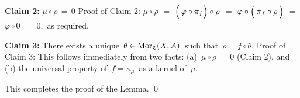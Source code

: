 \vskip 0.3cm
\noindent
\textbf{Claim 2:}\;\; $\mu \circ \rho \,=\, 0$
\vskip 0.1cm
\noindent
Proof of Claim 2:\;
$\mu \circ \rho$
\;$=$\; $\left(\,\varphi \overset{{\color{white}1}}{\circ} \pi_{f}\right)\circ \rho$
\;$=$\; $\varphi \circ \left(\, \pi_{f} \overset{{\color{white}1}}{\circ} \rho\, \right)$
\;$=$\; $\varphi \circ 0$
\;$=$\; $0$,\,
as required.

\vskip 0.3cm
\noindent
\textbf{Claim 3:}\;\;
There exists a unique \,$\theta \in \textnormal{Mor}_{\mathfrak{C}}(X,A)$\, such that \,$\rho = f \circ \theta$.
\vskip 0.1cm
\noindent
Proof of Claim 3:\;
This follows immediately from two facts:
(a)	\,$\mu \circ \rho \,=\, 0$ (Claim 2), and
(b)	the universal property of \,$f = \kappa_{\mu}$\, as a kernel of \,$\mu$.

\vskip 0.3cm
\noindent
This completes the proof of the Lemma.
\qed


